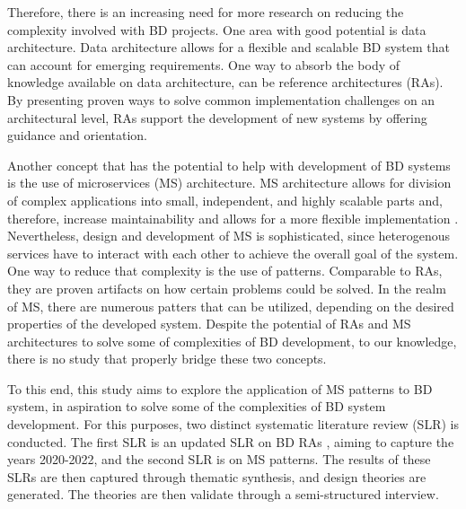 \documentclass[a4paper,11pt,article,oneside]{memoir}
\begin{document}
Therefore, there is an increasing need for more research on reducing the complexity involved with BD projects. One area with good potential is data architecture. Data architecture allows for a flexible and scalable BD system that can account for emerging requirements. One way to absorb the body of knowledge available on data architecture, can be reference architectures (RAs). By presenting proven ways to solve common implementation challenges on an architectural level, RAs support the development of new systems by offering guidance and orientation.





% 


Another concept that has the potential to help with development of BD systems is the use of microservices (MS) architecture. MS architecture allows for division of complex applications into small, independent, and highly scalable parts and, therefore, increase maintainability and allows for a more flexible implementation \cite{Richardson.2022}. Nevertheless, design and development of MS is sophisticated, since heterogenous services have to interact with each other to achieve the overall goal of the system. One way to reduce that complexity is the use of patterns. Comparable to RAs, they are proven artifacts on how certain problems could be solved. In the realm of MS, there are numerous patters that can be utilized, depending on the desired properties of the developed system. Despite the potential of RAs and MS architectures to solve some of complexities of BD development, to our knowledge, there is no study that properly bridge these two concepts. 


To this end, this study aims to explore the application of MS patterns to BD system, in aspiration to solve some of the complexities of BD system development. For this purposes, two distinct systematic literature review (SLR) is conducted. The first SLR is an updated SLR on BD RAs \cite{Ataei.2020}, aiming to capture the years 2020-2022, and the second SLR is on MS patterns. The results of these SLRs are then captured through thematic synthesis, and design theories are generated. The theories are then validate through a semi-structured interview.
\end{document}
